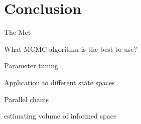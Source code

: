 \documentclass[letterpaper, 10 pt, conference]{ieeeconf}  %
\begin{document}
\section{Conclusion}




The Met

What MCMC algorithm is the best to use?

Parameter tuning

Application to different state spaces

Parallel chains

estimating volume of informed space







%
\end{document}

